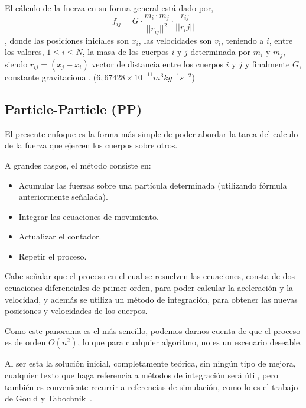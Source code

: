 


El cálculo de la fuerza en su forma general está dado por,
$$f_{ij} =G \cdot \frac{m_i \cdot m_j}{||r_{ij}||^{2}} \cdot \frac{r_{ij}}{||r_ij||}$$,
donde las posiciones iniciales son $x_i$,
las velocidades son $v_i$,
teniendo a $i$, entre los valores, $1 \leq i \leq N$,
la masa de los cuerpos $i$ y $j$ determinada por $m_i$ y $m_j$,
siendo $r_{ij} = (x_j - x_i )$ vector de distancia entre los cuerpos $i$ y $j$
y finalmente $G$, constante gravitacional. ($6,67428 \times 10^{-11} m^{3} kg^{-1} s^{-2}$)


\subsection{Particle-Particle (PP)}

El presente enfoque es la forma más simple de poder abordar
la tarea del calculo de la fuerza que ejercen los cuerpos sobre otros.

A grandes rasgos, el método consiste en:
\begin{itemize}
	\item Acumular las fuerzas sobre una partícula determinada (utilizando fórmula anteriormente señalada).
	\item Integrar las ecuaciones de movimiento.
	\item Actualizar el contador.
	\item Repetir el proceso.
\end{itemize}

Cabe señalar que el proceso en el cual se resuelven las ecuaciones,
consta de dos ecuaciones diferenciales de primer orden,
para poder calcular la aceleración y la velocidad,
y además se utiliza un método de integración, para obtener
las nuevas posiciones y velocidades de los cuerpos.

Como este panorama es el más sencillo,
podemos darnos cuenta de que el proceso es de orden $O(n^{2})$,
lo que para cualquier algoritmo, no es un escenario
deseable.

Al ser esta la solución inicial, completamente teórica,
sin ningún tipo de mejora, cualquier texto que haga
referencia a métodos de integración será útil,
pero también es conveniente recurrir a referencias
de simulación, como lo es el trabajo de Gould y Tabochnik~\cite{methods}.


